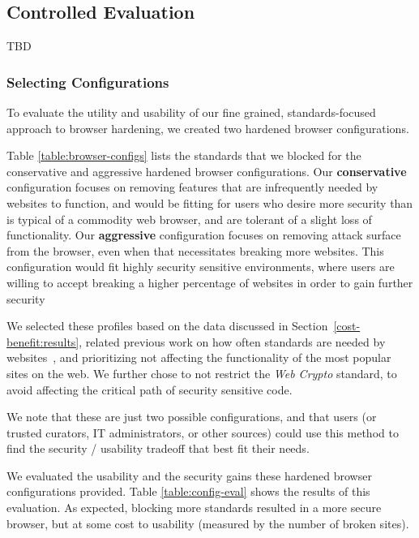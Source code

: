 \subsection{Controlled Evaluation}
TBD

\subsubsection{Selecting Configurations}
\label{current-web:extension:configurations}

To evaluate the utility and usability of our fine grained, standards-focused
approach to browser hardening, we created two hardened browser configurations.

Table \ref{table:browser-configs} lists the standards that we blocked for
the conservative and aggressive hardened browser configurations.
Our \textbf{conservative} configuration focuses on removing features that are infrequently needed by websites to function, and would be fitting for users who desire more
security than is typical of a commodity web browser, and are tolerant of a
slight loss of functionality.  Our \textbf{aggressive} configuration focuses on removing
attack surface from the browser, even when that necessitates breaking more websites.
This configuration would fit highly security sensitive environments, where users
are willing to accept breaking a higher percentage of websites in order to gain further security

We selected these profiles based on the data discussed in Section~\ref{cost-benefit:results}, related
previous work on how often standards are needed by websites~\cite{snyder2016browser},
and prioritizing not affecting the functionality of the most popular sites on the
web.  We further chose to not restrict the \emph{Web Crypto} standard, to
avoid affecting the critical path of security sensitive code.

We note that these are just two possible configurations, and that users
(or trusted curators, IT administrators, or other sources) could
use this method to find the security / usability tradeoff that best fit their needs.




We evaluated the usability and the security gains these hardened browser
configurations provided.  Table \ref{table:config-eval}
shows the results of this evaluation.  As expected, blocking more standards
resulted in a more secure browser, but at some cost to usability (measured
by the number of broken sites).

